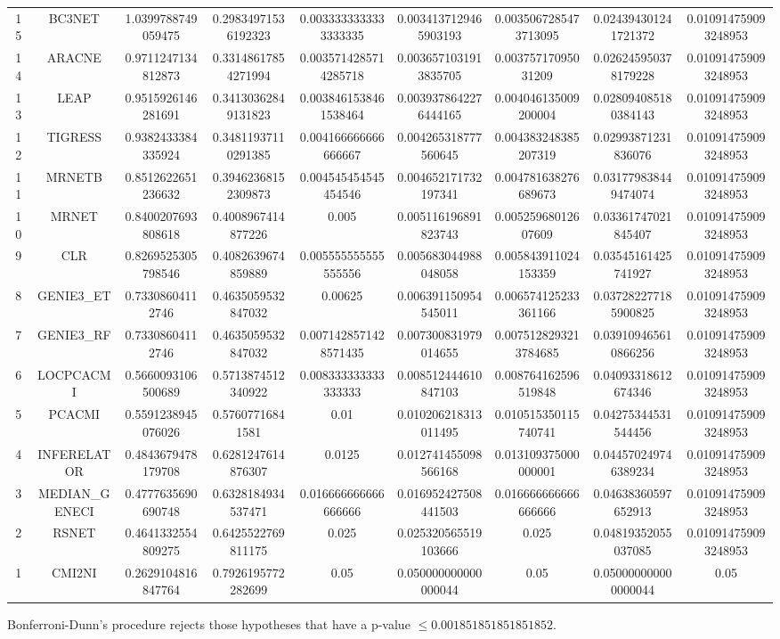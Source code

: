 \documentclass[a4paper,10pt]{article}
\begin{document}
\begin{landscape}
\begin{table}[!htp]
\begin{tabular}{ccccccccc}
15&BC3NET&1.0399788749059475&0.29834971536192323&0.0033333333333333335&0.0034137129465903193&0.0035067285473713095&0.024394301241721372&0.010914759093248953\\
14&ARACNE&0.9711247134812873&0.33148617854271994&0.0035714285714285718&0.0036571031913835705&0.00375717095031209&0.026245950378179228&0.010914759093248953\\
13&LEAP&0.9515926146281691&0.34130362849131823&0.0038461538461538464&0.0039378642276444165&0.004046135009200004&0.028094085180384143&0.010914759093248953\\
12&TIGRESS&0.9382433384335924&0.34811937110291385&0.004166666666666667&0.004265318777560645&0.004383248385207319&0.02993871231836076&0.010914759093248953\\
11&MRNETB&0.8512622651236632&0.39462368152309873&0.004545454545454546&0.004652171732197341&0.004781638276689673&0.031779838449474074&0.010914759093248953\\
10&MRNET&0.8400207693808618&0.4008967414877226&0.005&0.005116196891823743&0.00525968012607609&0.03361747021845407&0.010914759093248953\\
9&CLR&0.8269525305798546&0.4082639674859889&0.005555555555555556&0.005683044988048058&0.005843911024153359&0.03545161425741927&0.010914759093248953\\
8&GENIE3_ET&0.73308604112746&0.4635059532847032&0.00625&0.006391150954545011&0.006574125233361166&0.037282277185900825&0.010914759093248953\\
7&GENIE3_RF&0.73308604112746&0.4635059532847032&0.0071428571428571435&0.007300831979014655&0.0075128293213784685&0.039109465610866256&0.010914759093248953\\
6&LOCPCACMI&0.5660093106500689&0.5713874512340922&0.008333333333333333&0.008512444610847103&0.008764162596519848&0.04093318612674346&0.010914759093248953\\
5&PCACMI&0.5591238945076026&0.57607716841581&0.01&0.010206218313011495&0.010515350115740741&0.04275344531544456&0.010914759093248953\\
4&INFERELATOR&0.4843679478179708&0.6281247614876307&0.0125&0.012741455098566168&0.013109375000000001&0.044570249746389234&0.010914759093248953\\
3&MEDIAN_GENECI&0.4777635690690748&0.6328184934537471&0.016666666666666666&0.016952427508441503&0.016666666666666666&0.04638360597652913&0.010914759093248953\\
2&RSNET&0.4641332554809275&0.6425522769811175&0.025&0.025320565519103666&0.025&0.04819352055037085&0.010914759093248953\\
1&CMI2NI&0.2629104816847764&0.7926195772282699&0.05&0.050000000000000044&0.05&0.050000000000000044&0.05\\
\hline
\end{tabular}
\end{table}
Bonferroni-Dunn's procedure rejects those hypotheses that have a p-value $\le0.001851851851851852$.



\end{landscape}
\end{document}
